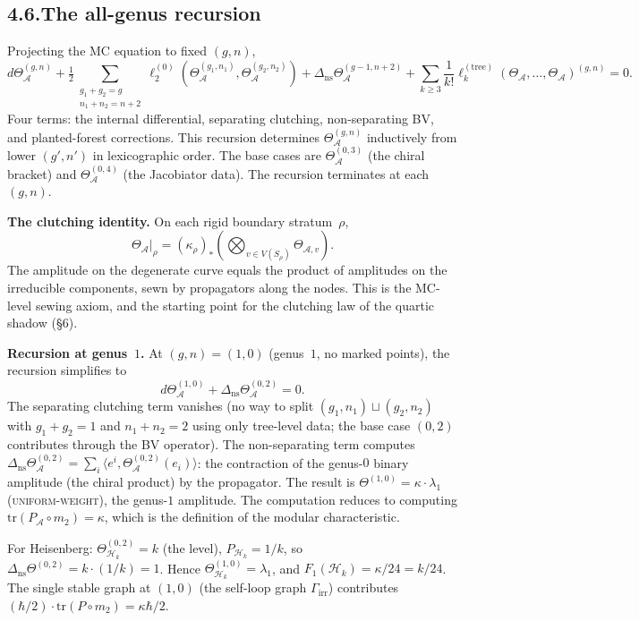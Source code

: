 \documentclass[11pt,reqno]{amsart}
\theoremstyle{definition}
\theoremstyle{remark}
\providecommand{\cA}{\mathcal{A}}
\providecommand{\cH}{\mathcal{H}}
\numberwithin{equation}{section}
\begin{document}
\subsection*{4.6.\enspace The all-genus recursion}

Projecting the MC equation to fixed $(g,n)$,
\[
d\Theta^{(g,n)}_\cA+\tfrac12\!\!\!\sum_{\substack{g_1+g_2=g\\n_1+n_2=n+2}}\!\!\!\ell_2^{(0)}(\Theta^{(g_1,n_1)}_\cA,\Theta^{(g_2,n_2)}_\cA)+\Delta_{\mathrm{ns}}\Theta^{(g-1,n+2)}_\cA+\sum_{k\ge 3}\frac{1}{k!}\ell_k^{(\mathrm{tree})}(\Theta_\cA,\ldots,\Theta_\cA)^{(g,n)}=0.
\]
Four terms: the internal differential, separating clutching,
non-separating BV, and planted-forest corrections. This recursion
determines $\Theta^{(g,n)}_\cA$ inductively from lower $(g',n')$ in
lexicographic order. The base cases are
$\Theta^{(0,3)}_\cA$ (the chiral bracket) and $\Theta^{(0,4)}_\cA$
(the Jacobiator data). The recursion terminates at each $(g,n)$.

\medskip
\noindent\textbf{The clutching identity.}\enspace
On each rigid boundary stratum~$\rho$,
\[
\Theta_\cA\big|_\rho=(\kappa_\rho)_*\!\left(\bigotimes_{v\in V(S_\rho)}\Theta_{\cA,v}\right).
\]
The amplitude on the degenerate curve equals the product of amplitudes
on the irreducible components, sewn by propagators along the nodes.
This is the MC-level sewing axiom, and the starting point for the
clutching law of the quartic shadow (\S6).

\medskip
\noindent\textbf{Recursion at genus~$1$.}\enspace
At $(g,n)=(1,0)$ (genus~$1$, no marked points), the recursion
simplifies to
\[
d\Theta^{(1,0)}_\cA+\Delta_{\mathrm{ns}}\Theta^{(0,2)}_\cA=0.
\]
The separating clutching term vanishes (no way to split
$(g_1,n_1)\sqcup(g_2,n_2)$ with $g_1+g_2=1$ and $n_1+n_2=2$ using
only tree-level data; the base case $(0,2)$ contributes through the
BV operator). The non-separating term computes
$\Delta_{\mathrm{ns}}\Theta^{(0,2)}_\cA=\sum_i\langle e^i,\Theta^{(0,2)}_\cA(e_i)\rangle$:
the contraction of the genus-$0$ binary amplitude (the chiral product)
by the propagator. The result is $\Theta^{(1,0)}=\kappa\cdot\lambda_1$
\textsc{(uniform-weight)}, the genus-$1$ amplitude. The computation
reduces to computing $\mathrm{tr}(P_\cA\circ m_2)=\kappa$, which is
the definition of the modular characteristic.

For Heisenberg: $\Theta^{(0,2)}_{\cH_k}=k$ (the level),
$P_{\cH_k}=1/k$, so $\Delta_{\mathrm{ns}}\Theta^{(0,2)}=k\cdot(1/k)=1$.
Hence $\Theta^{(1,0)}_{\cH_k}=\lambda_1$, and
$F_1(\cH_k)=\kappa/24=k/24$. The single stable graph at $(1,0)$
(the self-loop graph $\Gamma_{\mathrm{irr}}$) contributes
$(\hbar/2)\cdot\mathrm{tr}(P\circ m_2)=\kappa\hbar/2$.
\end{document}
